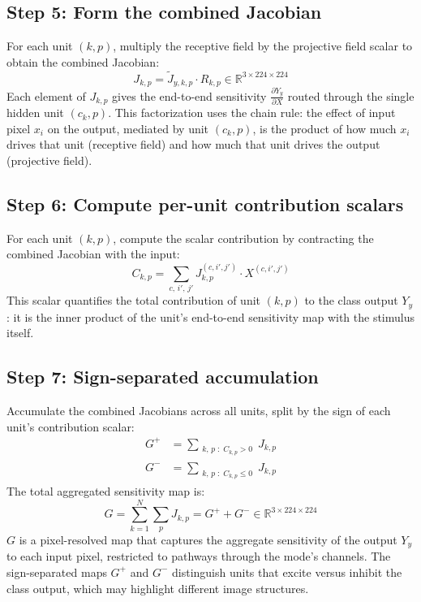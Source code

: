 \documentclass[11pt]{article}
\begin{document}
\subsection{Step 5: Form the combined Jacobian}

For each unit $(k, p)$, multiply the receptive field by the projective field scalar to obtain the combined Jacobian:
\begin{equation}
    J_{k,p} = \tilde{J}_{y,k,p} \cdot R_{k,p} \in \mathbb{R}^{3 \times 224 \times 224}
    \label{eq:combined}
\end{equation}
Each element of $J_{k,p}$ gives the end-to-end sensitivity $\frac{\partial Y_y}{\partial X}$ routed through the single hidden unit $(c_k, p)$.
This factorization uses the chain rule: the effect of input pixel $x_i$ on the output, mediated by unit $(c_k, p)$, is the product of how much $x_i$ drives that unit (receptive field) and how much that unit drives the output (projective field).

\subsection{Step 6: Compute per-unit contribution scalars}

For each unit $(k,p)$, compute the scalar contribution by contracting the combined Jacobian with the input:
\begin{equation}
    C_{k,p} = \sum_{c,\, i',\, j'} J_{k,p}^{(c,i',j')} \cdot X^{(c,i',j')}
    \label{eq:contribution}
\end{equation}
This scalar quantifies the total contribution of unit $(k,p)$ to the class output $Y_y$: it is the inner product of the unit's end-to-end sensitivity map with the stimulus itself.

\subsection{Step 7: Sign-separated accumulation}

Accumulate the combined Jacobians across all units, split by the sign of each unit's contribution scalar:
\begin{align}
    G^{+} &= \sum_{\substack{k,\, p \;:\; C_{k,p} > 0}} J_{k,p} \label{eq:pos} \\[4pt]
    G^{-} &= \sum_{\substack{k,\, p \;:\; C_{k,p} \leq 0}} J_{k,p} \label{eq:neg}
\end{align}
The total aggregated sensitivity map is:
\begin{equation}
    G = \sum_{k=1}^{N} \sum_{p} J_{k,p} = G^{+} + G^{-} \in \mathbb{R}^{3 \times 224 \times 224}
\end{equation}
$G$ is a pixel-resolved map that captures the aggregate sensitivity of the output $Y_y$ to each input pixel, restricted to pathways through the mode's channels.
The sign-separated maps $G^+$ and $G^-$ distinguish units that excite versus inhibit the class output, which may highlight different image structures.
\end{document}
